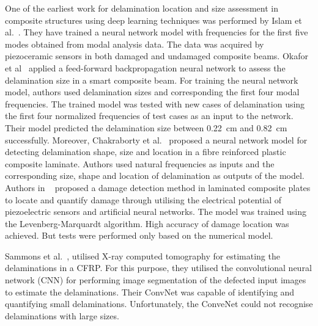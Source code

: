 \documentclass[preprint,9pt]{elsarticle}
\begin{document}
One of the earliest work for delamination location and size assessment in composite structures using deep learning techniques was performed by Islam et al.~\cite{islam1994damage}. 
They have trained a neural network model with frequencies for the first five modes obtained from modal analysis data. 
The data was acquired by piezoceramic sensors in both damaged and undamaged composite beams.
Okafor et al~\cite{okafor1996delamination} applied a feed-forward backpropagation neural network to assess the delamination size in a smart composite beam. 
For training the neural network model, authors used delamination sizes and corresponding the first four modal frequencies. 
The trained model was tested with new cases of delamination using the first four normalized frequencies of test cases as an input to the network. 
Their model predicted the delamination size between 0.22~cm and 0.82~cm successfully.
Moreover, Chakraborty et al.~\cite{chakraborty2005artificial} proposed a neural network model for detecting delamination shape, size and location in a fibre reinforced plastic composite laminate.
Authors used natural frequencies as inputs and the corresponding size, shape and location of delamination as outputs of the model. 
Authors in ~\cite{roseiro2005neural}  proposed a damage detection method in laminated composite plates to locate and quantify damage through utilising the electrical potential of piezoelectric sensors and artificial neural networks. 
The model was trained using the Levenberg-Marquardt algorithm. High accuracy of damage location was achieved.
But tests were performed only based on the numerical model.  

Sammons et al.~\cite{sammons2016segmenting}, utilised X-ray computed tomography for estimating the delaminations in a CFRP. 
For this purpose, they utilised the convolutional neural network (CNN) for performing image segmentation of the defected input images to estimate the delaminations. 
Their ConvNet was capable of identifying and quantifying small delaminations. 
Unfortunately, the ConveNet could not recognise delaminations with large sizes.
 
\end{document}

